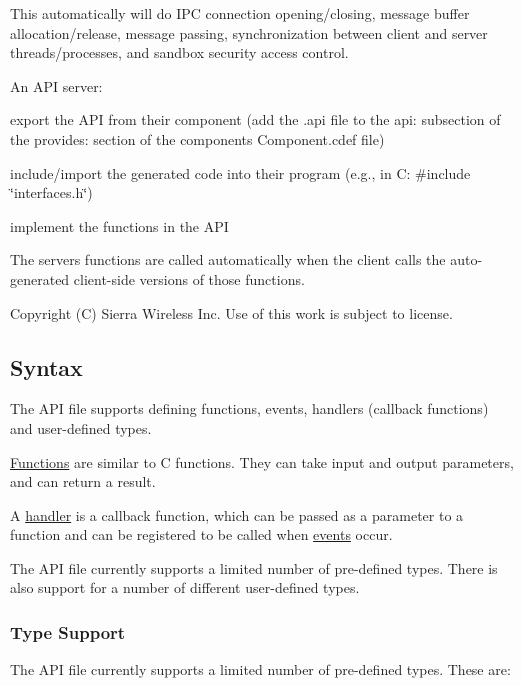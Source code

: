 This automatically will do I\+P\+C connection opening/closing, message buffer allocation/release, message passing, synchronization between client and server threads/processes, and sandbox security access control.

An A\+P\+I server\+:
\begin{DoxyItemize}
\item export the A\+P\+I from their component (add the {\ttfamily .api} file to the {\ttfamily api\+:} subsection of the {\ttfamily provides\+:} section of the component\textquotesingle{}s {\ttfamily Component.\+cdef} file)
\item include/import the generated code into their program (e.\+g., in C\+: {\ttfamily \#include \char`\"{}interfaces.\+h\char`\"{}})
\item implement the functions in the A\+P\+I
\end{DoxyItemize}

The server\textquotesingle{}s functions are called automatically when the client calls the auto-\/generated client-\/side versions of those functions.





Copyright (C) Sierra Wireless Inc. Use of this work is subject to license. \hypertarget{interfaceDefLangSyntax}{}\subsection{Syntax}\label{interfaceDefLangSyntax}
The A\+P\+I file supports defining functions, events, handlers (callback functions) and user-\/defined types.

\hyperlink{interface_def_lang_syntax_interfaceDefLangSyntax_function}{Functions} are similar to C functions. They can take input and output parameters, and can return a result.

A \hyperlink{interface_def_lang_syntax_interfaceDefLangSyntax_handler}{handler} is a callback function, which can be passed as a parameter to a function and can be registered to be called when \hyperlink{interface_def_lang_syntax_interfaceDefLangSyntax_event}{events} occur.

The A\+P\+I file currently supports a limited number of pre-\/defined types. There is also support for a number of different user-\/defined types.\hypertarget{interface_def_lang_syntax_interfaceDefLangSyntax_types}{}\subsubsection{Type Support}\label{interface_def_lang_syntax_interfaceDefLangSyntax_types}
The A\+P\+I file currently supports a limited number of pre-\/defined types. These are\+:

